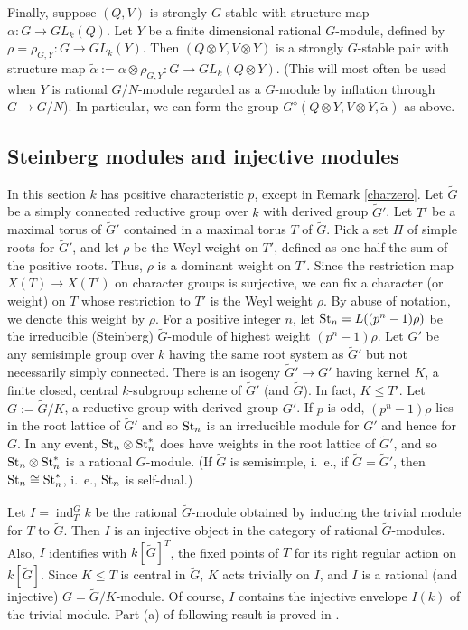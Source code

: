 \documentclass[11pt,leqno,amscd,amssymb,verbatim, url]{amsart}
\theoremstyle{definition}
\numberwithin{equation}{thm}
\newcommand{\St}{\text{\rm St}}
\newcommand{\ind}{\operatorname{ind}}
\begin{document}
Finally, suppose $(Q,V)$ is strongly $G$-stable with structure map $\alpha:G\to GL_k(Q)$. Let $Y$
be a finite dimensional rational $G$-module, defined by $\rho=\rho_{G,Y}:G\to GL_k(Y)$. Then $(Q\otimes Y,V\otimes Y)$ is a strongly $G$-stable pair with structure map 
$\widetilde\alpha:=\alpha\otimes \rho_{G,Y}:G\to GL_k(Q\otimes Y)$. (This will most often be used when $Y$ is   rational $G/N$-module regarded as a $G$-module by inflation through $G\to G/N$). In particular, we can form
the group $G^\diamond(Q\otimes Y,V\otimes Y,\widetilde\alpha)$ as above.

\subsection{Steinberg modules and injective modules} In this
section $k$ has positive characteristic $p$, except in Remark \ref{charzero}. Let $\widetilde G$ be a simply connected reductive group over $k$ with
derived group $\widetilde G'$. Let $T'$ be a maximal torus of $\widetilde G'$ contained in a maximal torus $T$ of $\widetilde G$. Pick a set $\Pi$ of simple roots for $\widetilde G'$, and let $\rho$ be the Weyl weight on $T'$, defined as one-half the
sum of the positive roots. Thus, $\rho$ is a dominant weight on $T'$. Since the restriction map $X(T)\to X(T')$ on
character groups is surjective, we can fix a character (or weight) on $T$ whose restriction to $T'$ is the Weyl weight
$\rho$. By abuse of notation, we denote this weight by $\rho$. For a positive integer $n$, let $\St_n=L((p^n-1)\rho)$
be the irreducible (Steinberg) $\widetilde G$-module of highest weight $(p^n-1)\rho$. Let $G'$ be any semisimple
group over $k$ having the same root system as $\widetilde G'$ but not necessarily simply connected. There is an isogeny
$\widetilde G'\to  G'$ having kernel $K$, a finite closed, central $k$-subgroup scheme of $\widetilde G'$ (and $\widetilde G$).  In fact, $K\leq T'$. Let $G:=
\widetilde G/K$, a reductive group with derived group $ G'$. If $p$ is odd, $(p^n-1)\rho$ lies in the root lattice
of $\widetilde G'$ and so $\St_n$ is an irreducible module for $G'$ and hence for $G$. In any event,
$\St_n\otimes \St_n^*$ does have weights in the root lattice of $\widetilde G'$, and so $\St_n\otimes\St_n^*$ is a rational
$G$-module. (If $\widetilde G$ is semisimple, i.~e., if $\widetilde G=\widetilde G'$, then $\St_n\cong \St_n^*$, i.~e., $\St_n$ is self-dual.)

Let $I=\ind_T^{\widetilde G}k$ be the rational $\widetilde G$-module obtained by inducing the trivial module for $T$ to $\widetilde G$. Then $I$ is an
injective object in the category of rational $\widetilde G$-modules. Also, $I$ identifies with $k[\widetilde G]^T$, the fixed points of
$T$ for its right regular action on $k[\widetilde G]$. Since $K\leq T$ is central in $\widetilde G$, $K$ acts trivially on $I$, and $I$ is
a rational (and injective) $ G=\widetilde G/K$-module. Of course, $I$ contains the injective envelope $I(k)$ of the
trivial module. Part (a) of following result is proved in \cite[II.10.13]{Jan}.
\end{document}

